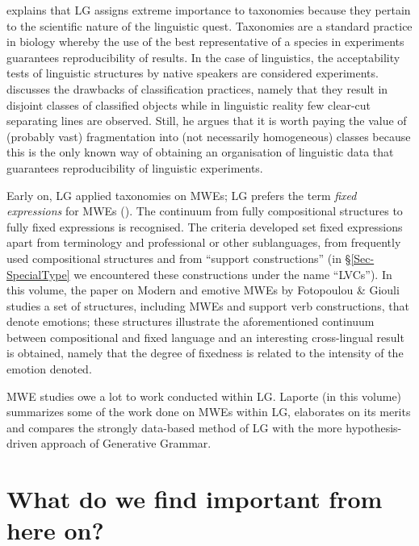 \documentclass[output=paper]{langsci/langscibook}
\begin{document}
\cite{Gross:77} explains that LG assigns extreme importance to taxonomies
because they pertain to the scientific nature of the linguistic quest. Taxonomies
are a standard practice in biology whereby the use of the best representative
of a species in experiments guarantees reproducibility of results. In the case
of linguistics, the acceptability tests of linguistic structures by native speakers
are considered experiments. \cite{Gross:78} discusses the drawbacks of classification
practices, namely that they result in disjoint classes of classified objects while
in linguistic reality few clear-cut separating lines are observed. Still, he argues
that it is worth paying the value of (probably vast) fragmentation into (not necessarily
homogeneous) classes because this is the only known way of obtaining
an organisation of linguistic data that guarantees reproducibility of linguistic
experiments.


Early on, LG applied taxonomies on MWEs; LG prefers the term {\em fixed expressions} for MWEs  (\citealt{gross1982,Gross1988a,Gross1988b}). The continuum from fully compositional structures to fully fixed expressions is recognised.  The criteria developed set fixed expressions apart from terminology and professional or other sublanguages, from frequently used compositional structures and from ``support constructions'' (in   §\ref{Sec-SpecialType}  we  encountered these constructions under the name ``LVCs''). In this volume, the paper on Modern  and  emotive MWEs by Fotopoulou \&  Giouli studies a set of structures, including MWEs and support verb constructions, that denote emotions; these structures illustrate the aforementioned continuum between compositional and fixed language and an interesting cross-lingual result is obtained, namely that the degree of fixedness is related to the intensity of the emotion denoted.

MWE studies owe a lot to work conducted within LG. Laporte (in this volume) summarizes some of the work done on MWEs within LG, elaborates on its merits and compares the strongly data-based method of LG with the more hypothesis-driven approach of Generative Grammar. 



\section{What do we find important from here on?}\label{Sec-Future}
\end{document}
